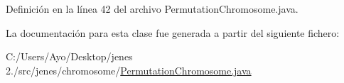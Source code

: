 Definición en la línea 42 del archivo Permutation\-Chromosome.\-java.



La documentación para esta clase fue generada a partir del siguiente fichero\-:\begin{DoxyCompactItemize}
\item 
C\-:/\-Users/\-Ayo/\-Desktop/jenes 2./src/jenes/chromosome/\hyperlink{_permutation_chromosome_8java}{Permutation\-Chromosome.\-java}\end{DoxyCompactItemize}
